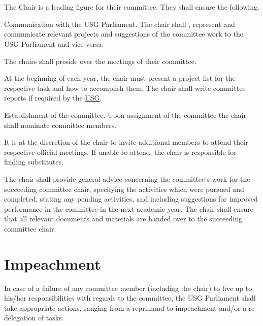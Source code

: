 \section{}
The Chair is a leading figure for their committee. They shall ensure the following.
\begin{parenum}
\item Communication with the USG Parliament. The chair shall , represent and communicate relevant projects and suggestions of the committee work to the USG Parliament and vice versa. 

\item The chairs shall preside over the meetings of their committee.

\item At the beginning of each year, the chair must present a project list for the respective task and how to accomplish them. The chair shall write committee reports if required by the \hyperref[USGdef]{USG}.

\item Establishment of the committee. Upon assignment of the committee the chair shall nominate committee members. 

\item It is at the discretion of the chair to invite additional members to attend their respective official meetings. If unable to attend, the chair is responsible for finding substitutes.

\item The chair shall provide general advice concerning the committee's work for the succeeding committee chair, specifying the activities which were pursued and completed, stating any pending activities, and including suggestions for improved performance in the committee in the next academic year. The chair shall ensure that all relevant documents and materials are handed over to the succeeding committee chair. 
\end{parenum}

\section{Impeachment}
In case of a failure of any committee member (including the chair) to live up to his/her responsibilities with regards to the committee, the USG Parliament shall take appropriate actions, ranging from a reprimand to impeachment and/or a re-delegation of tasks.


